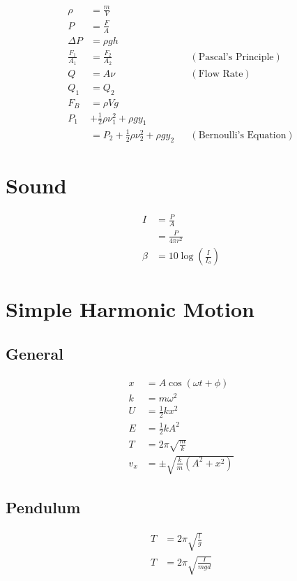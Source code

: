 \documentclass[10pt]{article}
\begin{document}
\begin{multicols*}{4}
\begin{align*}
    \rho &= \frac{m}{V}\\
    P &= \frac{F}{A}\\
    \Delta P &= \rho gh\\
    \frac{F_1}{A_1} &= \frac{F_2}{A_2} && (\text{Pascal's
	Principle})\\
    Q &= A\nu && (\text{Flow Rate})\\
    Q_1 &= Q_2\\
    F_B &= \rho Vg\\
    P_1 &+ \frac{1}{2}\rho \nu_1^2 + \rho gy_1\\
	&= P_2 + \frac{1}{2}\rho \nu_2^2 + \rho gy_2 &&
	(\text{Bernoulli's Equation})
\end{align*}

\section{Sound}

\begin{align*}
    I &= \frac{P}{A}\\
      &= \frac{P}{4\pi r^2}\\
    \beta &= 10 \log \left({\frac{I}{I_o}}\right)
\end{align*}

\section{Simple Harmonic Motion}
\vspace{2ex}
\subsection{General}

\begin{align*}
    x &= A \cos (\omega t + \phi)\\
    k &= m\omega^2\\
    U &= \tfrac{1}{2} kx^2\\
    E &= \tfrac{1}{2} kA^2\\
    T &= 2\pi \sqrt{\frac{m}{k}}\\
    v_x &= \pm \sqrt{\tfrac{k}{m} (A^2 + x^2)}
\end{align*}

\subsection{Pendulum}

\begin{align*}
    T &= 2\pi \sqrt{\frac{l}{g}}\\
    T &= 2\pi \sqrt{\frac{I}{mgd}}
\end{align*}

\end{multicols*}
\end{document}
